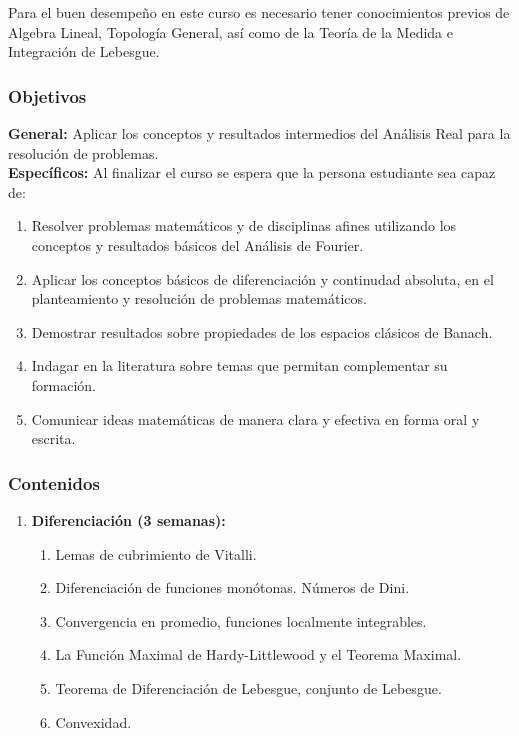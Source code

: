 \begin{refsection}
Para el buen desempeño en este curso es necesario tener conocimientos previos de Algebra Lineal, Topología General, así como de la Teoría de la Medida e Integración de Lebesgue. 



\subsubsection*{Objetivos}

\textbf{General:} Aplicar los conceptos y resultados intermedios del Análisis Real para la resolución de problemas. \\

\textbf{Específicos:} Al finalizar el curso se espera que la persona estudiante sea capaz de:

\begin{enumerate}
\item Resolver problemas matemáticos y de disciplinas afines utilizando los conceptos y resultados básicos del Análisis de Fourier.
\item Aplicar los conceptos b\'asicos de diferenciación y continudad absoluta, en el planteamiento y resoluci\'on de problemas matem\'aticos.
\item Demostrar resultados sobre propiedades de los espacios clásicos de Banach.
\item Indagar en la literatura sobre temas que permitan complementar su formación.
\item Comunicar ideas matemáticas de manera clara y efectiva en forma oral y escrita.
\end{enumerate}

\subsubsection*{Contenidos}

\begin{enumerate}
\item \textbf{Diferenciación (3 semanas):} 
\begin{enumerate}
    \item Lemas de cubrimiento de Vitalli.
    \item Diferenciación de funciones monótonas. Números de Dini.
    \item Convergencia en promedio, funciones localmente integrables.
    \item La Función Maximal de Hardy-Littlewood y el Teorema Maximal.
    \item Teorema de Diferenciación de Lebesgue, conjunto de Lebesgue.
    \item Convexidad.
\end{enumerate}


\end{enumerate}
\end{refsection}
